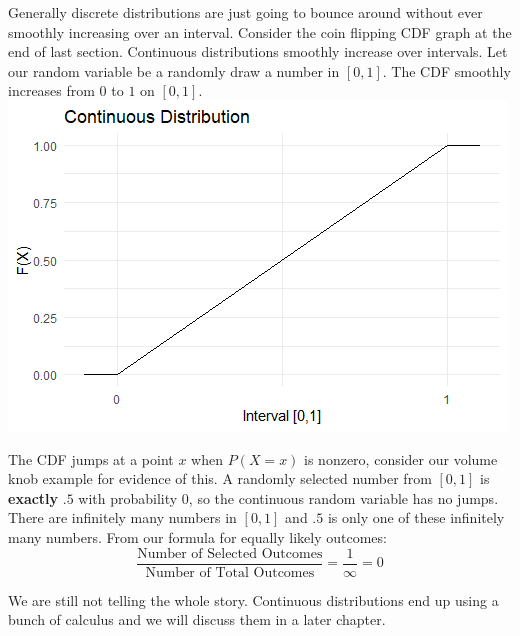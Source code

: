 \documentclass[
]{book}
\theoremstyle{definition}
\theoremstyle{definition}
\theoremstyle{definition}
\theoremstyle{remark}
\begin{document}
Generally discrete distributions are just going to bounce around without ever smoothly increasing over an interval. Consider the coin flipping CDF graph at the end of last section. Continuous distributions smoothly increase over intervals. Let our random variable be a randomly draw a number in \([0,1]\). The CDF smoothly increases from \(0\) to \(1\) on \([0,1]\).
\includegraphics{Pictures/04-RV/continuousplot.PNG}

The CDF jumps at a point \(x\) when \(P(X=x)\) is nonzero, consider our volume knob example for evidence of this. A randomly selected number from \([0,1]\) is \textbf{exactly} \(.5\) with probability \(0\), so the continuous random variable has no jumps. There are infinitely many numbers in \([0,1]\) and \(.5\) is only one of these infinitely many numbers. From our formula for equally likely outcomes:
\[\frac{\text{Number of Selected Outcomes}}{\text{Number of Total Outcomes}}=\frac{1}{\infty}=0\]

We are still not telling the whole story. Continuous distributions end up using a bunch of calculus and we will discuss them in a later chapter.

\backmatter
  
\end{document}
